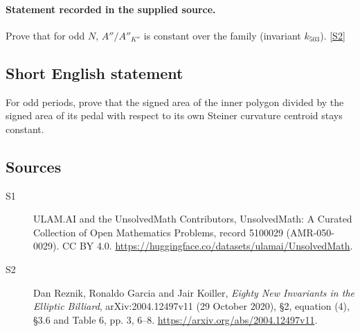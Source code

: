 \documentclass[11pt]{article}
\newcommand{\sref}[2]{\hyperlink{source:#1:#2}{[S#2]}}
\begin{document}
\paragraph{Statement recorded in the supplied source.}
Prove that for odd $N$, $A''/A''_{K''}$ is constant over the family (invariant $k_{503}$). \sref{5100029}{2}
\subsection{Short English statement}
For odd periods, prove that the signed area of the inner polygon divided by the signed area of its pedal with respect to its own Steiner curvature centroid stays constant.
\subsection{Sources}
\begin{description}
\item[\hypertarget{source:5100029:1}{S1}] ULAM.AI and the UnsolvedMath Contributors, UnsolvedMath: A Curated Collection of Open Mathematics Problems, record 5100029 (AMR-050-0029). CC BY 4.0. \url{https://huggingface.co/datasets/ulamai/UnsolvedMath}.
\item[\hypertarget{source:5100029:2}{S2}] Dan Reznik, Ronaldo Garcia and Jair Koiller, \emph{Eighty New Invariants in the Elliptic Billiard}, arXiv:2004.12497v11 (29 October 2020), \S2, equation (4), \S3.6 and Table 6, pp. 3, 6--8. \url{https://arxiv.org/abs/2004.12497v11}.
\end{description}
\label{end:5100029}
\end{document}

